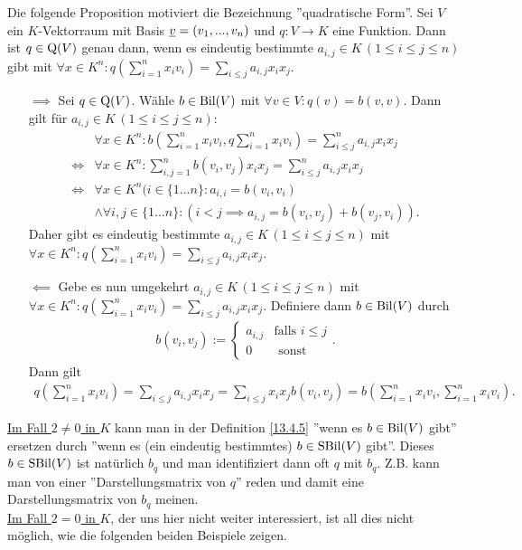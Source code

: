\documentclass[../../main.tex]{subfiles}
\begin{document}
\begin{pro}\label{13.4.7}
Die folgende Proposition motiviert die Bezeichnung ''quadratische Form''. Sei $V$ ein $K$-Vektorraum mit Basis ${\underline v}=(v_1,...,v_n)$ und $q: V\to K$ eine Funktion. Dann ist $q\in \operatorname{Q}(V)$ genau dann, wenn es eindeutig bestimmte $a_{i,j}\in K\, (1\le i\le j\le n)$ gibt mit $\forall x\in K^n: q\left(\sum_{i=1}^nx_iv_i\right)=\sum_{i\le j}a_{i,j}x_ix_j$.
\end{pro}
\begin{cproof}
\begin{itemize}
\item[$\implies$] Sei $q\in \operatorname{Q}(V)$. Wähle $b\in \operatorname{Bil}(V)$ mit $\forall v\in V: q(v)=b(v,v)$. Dann gilt für $a_{i,j}\in K\, (1\le i\le j\le n)$:
\begin{align*}
&\forall x\in K^n: b\left(\sum_{i=1}^n x_iv_i, q \sum_{i=1}^n x_iv_i\right)=\sum_{i\le j}^n a_{i,j}x_ix_j\\
\Longleftrightarrow&\forall x\in K^n:\sum_{i,j=1}^n b(v_i,v_j)x_ix_j=\sum_{i\le j}^n a_{i,j}x_ix_j\\
\Longleftrightarrow&\forall x\in K^n (i\in\{1...n\}: a_{i,i}=b(v_i,v_i)\\
&\land \forall i,j\in\{1...n\}: (i<j\implies a_{i,j}=b(v_i,v_j)+b(v_j,v_i)).
\end{align*}
Daher gibt es eindeutig bestimmte $a_{i,j}\in K\, (1\le i\le j\le n)$ mit $\forall x\in K^n: q\left(\sum_{i=1}^nx_iv_i\right)=\sum_{i\le j}a_{i,j}x_ix_j$.
\item[$\impliedby$] Gebe es nun umgekehrt $a_{i,j}\in K\, (1\le i\le j\le n)$ mit $\forall x\in K^n: q\left(\sum_{i=1}^nx_iv_i\right)=\sum_{i\le j}a_{i,j}x_ix_j$. Definiere dann $b\in \operatorname{Bil}(V)$ durch
\begin{align*}
b(v_i,v_j):=\begin{cases}a_{i,j} & \text{falls }i\le j\\ 0 & \text{ sonst}\end{cases}.
\end{align*}
Dann gilt
\begin{align*}
q\left(\sum_{i=1}^nx_iv_i\right)=\sum_{i\le j}a_{i,j}x_ix_j=\sum_{i\le j}x_ix_jb(v_i,v_j)=b\left(\sum_{i=1}^n x_iv_i,\sum_{i=1}^nx_iv_i\right).
\end{align*}
\end{itemize}
\end{cproof}

\begin{bem}\label{13.4.8}
\underline{Im Fall $2\neq 0$ in $K$} kann man in der Definition \ref{13.4.5} ''wenn es $b\in \operatorname{Bil}(V)$ gibt'' ersetzen durch ''wenn es (ein eindeutig bestimmtes) $b\in \operatorname{SBil}(V)$ gibt''. Dieses $b\in \operatorname{SBil}(V)$ ist natürlich $b_q$ und man identifiziert dann oft $q$ mit $b_q$. Z.B. kann man von einer ''Darstellungsmatrix von $q$'' reden und damit eine Darstellungsmatrix von $b_q$ meinen.\\
	
\noindent\underline{Im Fall $2=0$ in $K$}, der uns hier nicht weiter interessiert, ist all dies nicht möglich, wie die folgenden beiden Beispiele zeigen.
\end{bem}
	
\end{document}
